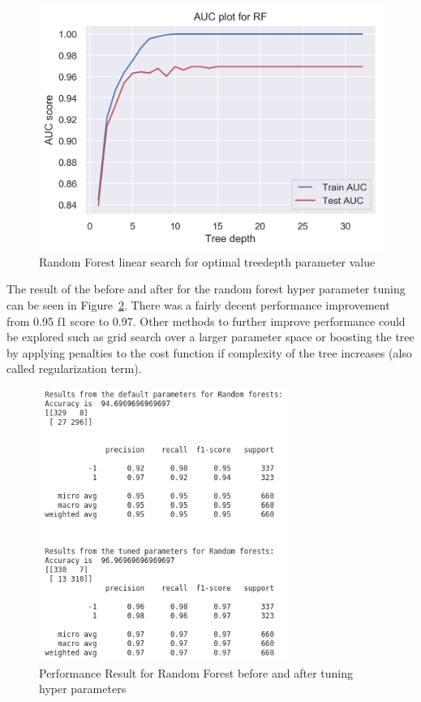 \begin{figure}[!ht]
 \centering
\includegraphics[width=6.1in]{assignment2/2-3-b-rf(Treedepth).png}
\caption{\label{fig:rftreedepth} Random Forest linear search for optimal treedepth parameter value}
\end{figure}

The result of the before and after for the random forest hyper parameter tuning can be seen in Figure~\ref{fig:resulstsrftune}. There was a fairly decent performance improvement from 0.95 f1 score to 0.97. Other methods to further improve performance could be explored such as grid search over a larger parameter space or boosting the tree by applying penalties to the cost function if complexity of the tree increases (also called regularization term).

\begin{figure}[!ht]
 \centering
\includegraphics[height=3.5in]{assignment2/2-3-b-rfresult.png}
\caption{\label{fig:resulstsrftune} Performance Result for Random Forest before and after tuning hyper parameters}
\end{figure}

